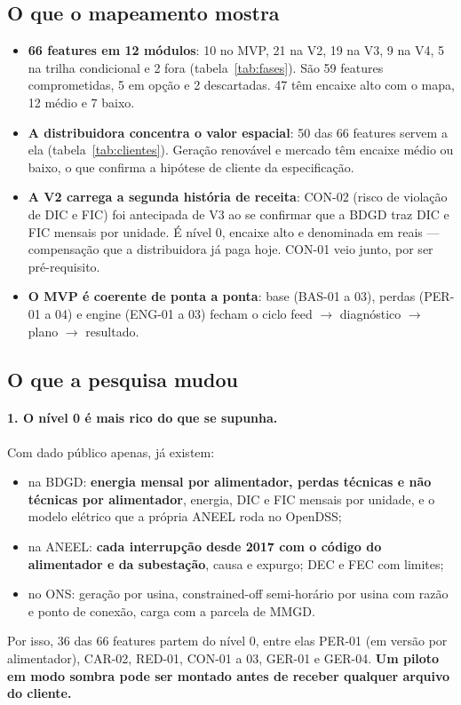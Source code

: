 
\subsection*{O que o mapeamento mostra}

\begin{itemize}
  \item \textbf{66 features em 12 módulos}: 10 no MVP, 21 na V2, 19 na V3, 9
    na V4, 5 na trilha condicional e 2 fora (tabela~\ref{tab:fases}). São 59
    features comprometidas, 5 em opção e 2 descartadas. 47 têm encaixe alto com o mapa, 12
    médio e 7 baixo.
  \item \textbf{A distribuidora concentra o valor espacial}: 50 das 66
    features servem a ela (tabela~\ref{tab:clientes}). Geração renovável e
    mercado têm encaixe médio ou baixo, o que confirma a hipótese de cliente
    da especificação.
  \item \textbf{A V2 carrega a segunda história de receita}: CON-02 (risco de
    violação de DIC e FIC) foi antecipada de V3 ao se confirmar que a BDGD
    traz DIC e FIC mensais por unidade. É nível 0, encaixe alto e denominada
    em reais --- compensação que a distribuidora já paga hoje. CON-01 veio
    junto, por ser pré-requisito.
  \item \textbf{O MVP é coerente de ponta a ponta}: base (BAS-01 a 03), perdas
    (PER-01 a 04) e engine (ENG-01 a 03) fecham o ciclo feed $\rightarrow$
    diagnóstico $\rightarrow$ plano $\rightarrow$ resultado.
\end{itemize}

\subsection*{O que a pesquisa mudou}

\paragraph{1. O nível 0 é mais rico do que se supunha.} Com dado público
apenas, já existem:
\begin{itemize}
  \item na BDGD: \textbf{energia mensal por alimentador, perdas técnicas e não
    técnicas por alimentador}, energia, DIC e FIC mensais por unidade, e o
    modelo elétrico que a própria ANEEL roda no OpenDSS;
  \item na ANEEL: \textbf{cada interrupção desde 2017 com o código do
    alimentador e da subestação}, causa e expurgo; DEC e FEC com limites;
  \item no ONS: geração por usina, constrained-off semi-horário por usina com
    razão e ponto de conexão, carga com a parcela de MMGD.
\end{itemize}
Por isso, 36 das 66 features partem do nível 0, entre elas PER-01 (em versão
por alimentador), CAR-02, RED-01, CON-01 a 03, GER-01 e GER-04. \textbf{Um
piloto em modo sombra pode ser montado antes de receber qualquer arquivo do
cliente.}

